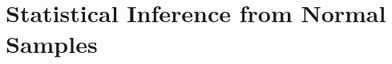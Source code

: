 \documentclass[../main.tex]{subfiles}
\begin{document}
\chapter{Statistical Inference from Normal Samples}
\end{document}
